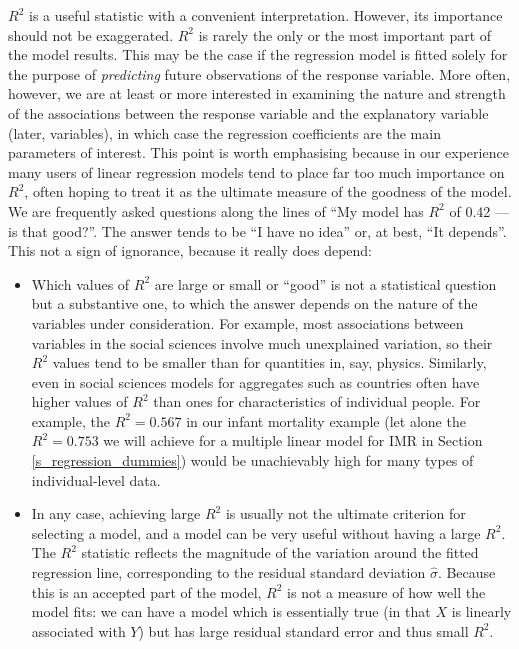 $R^{2}$ is a useful statistic with a convenient interpretation. However,
its importance should not be exaggerated. $R^{2}$ is rarely the only or
the most important part of the model results. This may be the case if the
regression model is fitted solely for the purpose of \emph{predicting} future
observations of the response variable. More often, however, we are at
least or more interested in examining the nature and strength of the
associations between the response variable and the explanatory variable
(later, variables), in which case the regression coefficients are the
main parameters of interest. This point is worth emphasising because in
our experience many users of linear regression models tend to place far
too much importance on $R^{2}$, often hoping to treat it as the ultimate
measure of the goodness of the model. We are frequently asked questions along
the lines of ``My model has $R^{2}$ of 0.42 --- is that good?''. The
answer tends to be ``I have no idea'' or, at best, ``It depends''. This
not a sign of ignorance, because it really does depend:
\begin{itemize}
\item
Which values of $R^{2}$ are large or small or ``good'' is not a
statistical question but a substantive one,  to which the answer depends on the nature
of the variables under consideration. For example, most associations
between variables in the social sciences involve much unexplained
variation, so their $R^{2}$ values tend to be smaller than for
quantities in, say, physics. Similarly, even in social sciences
models for aggregates such as
countries often have higher values of $R^{2}$
than ones for characteristics of individual people. For example, the
$R^{2}=0.567$ in our infant mortality example
(let alone the $R^{2}=0.753$ we will achieve for a multiple linear model
for IMR in Section \ref{s_regression_dummies}) would be unachievably
high for many types of individual-level data.
\item
In any case, achieving large $R^{2}$ is usually not the ultimate
criterion for selecting a model, and a model can be very useful without
having a large $R^{2}$. The
$R^{2}$ statistic reflects the magnitude of the variation around the fitted
regression line, corresponding to the residual standard deviation
$\hat{\sigma}$. Because this is an accepted part of the model, $R^{2}$ is not a
measure of how well the model fits: we can have a model which is
essentially true (in that $X$ is linearly associated with $Y$) but has
large residual standard error and thus small $R^{2}$.
\end{itemize}


